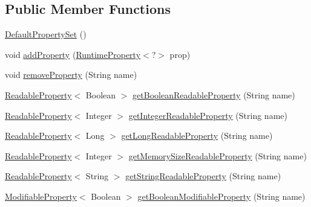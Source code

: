 \subsection*{Public Member Functions}
\begin{DoxyCompactItemize}
\item 
\mbox{\hyperlink{classcom_1_1mysql_1_1cj_1_1conf_1_1_default_property_set_a360df216fd0e3e7e250e3ccf93ad637a}{Default\+Property\+Set}} ()
\item 
void \mbox{\hyperlink{classcom_1_1mysql_1_1cj_1_1conf_1_1_default_property_set_aaab8bb4b45a6e77efa0987edee78924c}{add\+Property}} (\mbox{\hyperlink{interfacecom_1_1mysql_1_1cj_1_1conf_1_1_runtime_property}{Runtime\+Property}}$<$?$>$ prop)
\item 
void \mbox{\hyperlink{classcom_1_1mysql_1_1cj_1_1conf_1_1_default_property_set_ae797c54a9e9152a4fd284bc96bc4e12f}{remove\+Property}} (String name)
\item 
\mbox{\hyperlink{interfacecom_1_1mysql_1_1cj_1_1conf_1_1_readable_property}{Readable\+Property}}$<$ Boolean $>$ \mbox{\hyperlink{classcom_1_1mysql_1_1cj_1_1conf_1_1_default_property_set_aac90679a7d9bf30e9f122be52f095384}{get\+Boolean\+Readable\+Property}} (String name)
\item 
\mbox{\hyperlink{interfacecom_1_1mysql_1_1cj_1_1conf_1_1_readable_property}{Readable\+Property}}$<$ Integer $>$ \mbox{\hyperlink{classcom_1_1mysql_1_1cj_1_1conf_1_1_default_property_set_a58ff54d9bc14d56562767d4cec5c510e}{get\+Integer\+Readable\+Property}} (String name)
\item 
\mbox{\hyperlink{interfacecom_1_1mysql_1_1cj_1_1conf_1_1_readable_property}{Readable\+Property}}$<$ Long $>$ \mbox{\hyperlink{classcom_1_1mysql_1_1cj_1_1conf_1_1_default_property_set_ae3159cdeb5ee6bc987ca800feecef60c}{get\+Long\+Readable\+Property}} (String name)
\item 
\mbox{\hyperlink{interfacecom_1_1mysql_1_1cj_1_1conf_1_1_readable_property}{Readable\+Property}}$<$ Integer $>$ \mbox{\hyperlink{classcom_1_1mysql_1_1cj_1_1conf_1_1_default_property_set_ae7157aefbd409a972ffe014ab383d25b}{get\+Memory\+Size\+Readable\+Property}} (String name)
\item 
\mbox{\hyperlink{interfacecom_1_1mysql_1_1cj_1_1conf_1_1_readable_property}{Readable\+Property}}$<$ String $>$ \mbox{\hyperlink{classcom_1_1mysql_1_1cj_1_1conf_1_1_default_property_set_a3eedd64227cd2e0ad94201c64992a259}{get\+String\+Readable\+Property}} (String name)
\item 
\mbox{\hyperlink{interfacecom_1_1mysql_1_1cj_1_1conf_1_1_modifiable_property}{Modifiable\+Property}}$<$ Boolean $>$ \mbox{\hyperlink{classcom_1_1mysql_1_1cj_1_1conf_1_1_default_property_set_a6b85f1ed4be93d0f58d5d8d0fa0e04b1}{get\+Boolean\+Modifiable\+Property}} (String name)

\end{DoxyCompactItemize}

